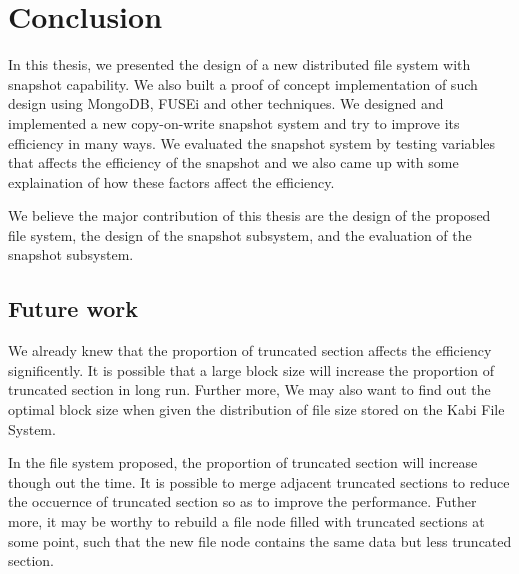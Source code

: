 \chapter{Conclusion}
\label{chap:conclusion}

    In this thesis, we presented the design of a new distributed file system with snapshot capability. We also built a proof of concept implementation of such design using MongoDB, FUSEi and other techniques. We designed and implemented a new copy-on-write snapshot system and try to improve its efficiency in many ways. We evaluated the snapshot system by testing variables that affects the efficiency of the snapshot and we also came up with some explaination of how these factors affect the efficiency.

    We believe the major contribution of this thesis are the design of the proposed file system, the design of the snapshot subsystem, and the evaluation of the snapshot subsystem.

\section{Future work}

     We already knew that the proportion of truncated section affects the efficiency significently. It is possible that a large block size will increase the proportion of truncated section in long run. Further more, We may also want to find out the optimal block size when given the distribution of file size stored on the Kabi File System.

     In the file system proposed, the proportion of truncated section will increase though out the time. It is possible to merge adjacent truncated sections to reduce the occuernce of truncated section so as to improve the performance. Futher more, it may be worthy to rebuild a file node filled with truncated sections at some point, such that the new file node contains the same data but less truncated section.
